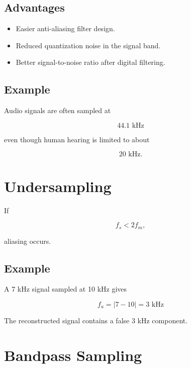 \subsection{Advantages}

\begin{itemize}
\item Easier anti-aliasing filter design.
\item Reduced quantization noise in the signal band.
\item Better signal-to-noise ratio after digital filtering.
\end{itemize}


\subsection{Example}

Audio signals are often sampled at

\[
44.1\text{ kHz}
\]

even though human hearing is limited to about

\[
20\text{ kHz}.
\]


\section{Undersampling}

If

\[
f_s<2f_m,
\]

aliasing occurs.


\subsection{Example}

A 7 kHz signal sampled at 10 kHz gives

\[
f_a=|7-10|=3\text{ kHz}
\]

The reconstructed signal contains a false 3 kHz component.


\section{Bandpass Sampling}

